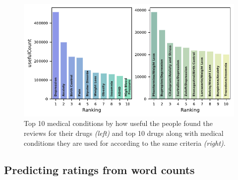 \documentclass{article}
\begin{document}
\begin{figure}[h!]
\includegraphics{plots/figure1_1.pdf}
\caption{Top 10 medical conditions by how useful the people found the reviews for their drugs \textit{(left)} and top 10 drugs along with medical conditions they are used for according to the same criteria \textit{(right)}.}
\label{fig:bars}
\centering
\end{figure}

\subsection{Predicting ratings from word counts}
\end{document}
